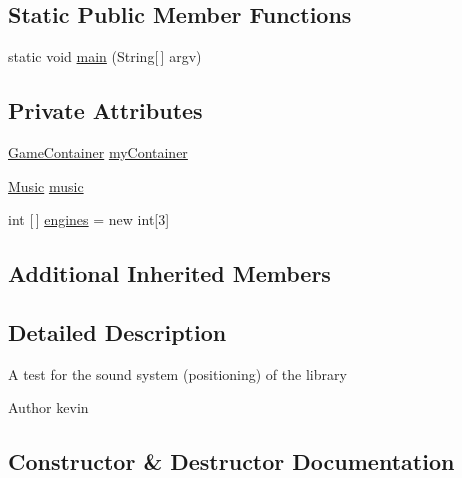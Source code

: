 \subsection*{Static Public Member Functions}
\begin{DoxyCompactItemize}
\item 
static void \mbox{\hyperlink{classorg_1_1newdawn_1_1slick_1_1tests_1_1_sound_position_test_ae0ec89dcb26b73d7a3dae0b347d82c51}{main}} (String\mbox{[}$\,$\mbox{]} argv)
\end{DoxyCompactItemize}
\subsection*{Private Attributes}
\begin{DoxyCompactItemize}
\item 
\mbox{\hyperlink{classorg_1_1newdawn_1_1slick_1_1_game_container}{Game\+Container}} \mbox{\hyperlink{classorg_1_1newdawn_1_1slick_1_1tests_1_1_sound_position_test_a1a4e43050e4245d73eb5722dc6e8f7ab}{my\+Container}}
\item 
\mbox{\hyperlink{classorg_1_1newdawn_1_1slick_1_1_music}{Music}} \mbox{\hyperlink{classorg_1_1newdawn_1_1slick_1_1tests_1_1_sound_position_test_a58ef86e1bdbe61ff8fc326581f3c163c}{music}}
\item 
int \mbox{[}$\,$\mbox{]} \mbox{\hyperlink{classorg_1_1newdawn_1_1slick_1_1tests_1_1_sound_position_test_aa5ae5490534c324ffc26498dab22a97b}{engines}} = new int\mbox{[}3\mbox{]}
\end{DoxyCompactItemize}
\subsection*{Additional Inherited Members}


\subsection{Detailed Description}
A test for the sound system (positioning) of the library

\begin{DoxyAuthor}{Author}
kevin 
\end{DoxyAuthor}


\subsection{Constructor \& Destructor Documentation}
\mbox{\label{classorg_1_1newdawn_1_1slick_1_1tests_1_1_sound_position_test_a9393035f9627e1f00c37d713d2d32107}} 
